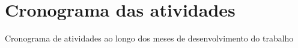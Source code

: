 \chapter{Cronograma das atividades} \label{atividades}

Cronograma de atividades ao longo dos meses de desenvolvimento do trabalho

\begin{table}[H]\centering
  \caption{Etapas do Projeto de Pesquisa}
  \label{tab:etapas}
\end{table}
